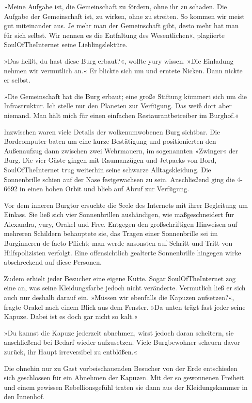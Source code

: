 »Meine Aufgabe ist, die Gemeinschaft zu fördern, ohne ihr zu schaden. Die Aufgabe der Gemeinschaft ist, zu wirken, ohne zu streiten. So kommen wir meist gut miteinander aus. Je mehr man der Gemeinschaft gibt, desto mehr hat man für sich selbst. Wir nennen es die Entfaltung des Wesentlichen«, plagiierte SoulOfTheInternet seine Lieblingslektüre.

»Das heißt, du hast diese Burg erbaut?«, wollte yury wissen. »Die Einladung nehmen wir vermutlich an.« Er blickte sich um und erntete Nicken. Dann nickte er selbst.

»Die Gemeinschaft hat die Burg erbaut; eine große Stiftung kümmert sich um die Infrastruktur. Ich stelle nur den Planeten zur Verfügung. Das weiß dort aber niemand. Man hält mich für einen einfachen Restaurantbetreiber im Burghof.«

Inzwischen waren viele Details der wolkenumwobenen Burg sichtbar. Die Bordcomputer baten um eine kurze Bestätigung und positionierten den Außenaufzug dann zwischen zwei Wehrmauern, im sogenannten »Zwinger« der Burg. Die vier Gäste gingen mit Raumanzügen und Jetpacks von Bord, SoulOfTheInternet trug weiterhin seine schwarze Alltagskleidung. Die Sonnenbrille schien auf der Nase festgewachsen zu sein. Anschließend ging die 4-6692 in einen hohen Orbit und blieb auf Abruf zur Verfügung.

Vor dem inneren Burgtor ersuchte die Seele des Internets mit ihrer Begleitung um Einlass. Sie ließ sich vier Sonnenbrillen aushändigen, wie maßgeschneidert für Alexandra, yury, Orakel und Free. Entgegen den großschriftigen Hinweisen auf mehreren Schildern behauptete sie, das Tragen einer Sonnenbrille sei im Burginneren de facto Pflicht; man werde ansonsten auf Schritt und Tritt von Hilfspolizisten verfolgt. Eine offensichtlich gealterte Sonnenbrille hingegen wirke abschreckend auf diese Personen.

Zudem erhielt jeder Besucher eine eigene Kutte. Sogar SoulOfTheInternet zog eine an, was seine Kleidungsfarbe jedoch nicht veränderte. Vermutlich ließ er sich auch nur deshalb darauf ein. »Müssen wir ebenfalls die Kapuzen aufsetzen?«, fragte Orakel nach einem Blick aus dem Fenster. »Da unten trägt fast jeder seine Kapuze. Dabei ist es doch gar nicht so kalt.«

»Du kannst die Kapuze jederzeit abnehmen, wirst jedoch daran scheitern, sie anschließend bei Bedarf wieder aufzusetzen. Viele Burgbewohner scheuen davor zurück, ihr Haupt irreversibel zu entblößen.«

Die ohnehin nur zu Gast vorbeischauenden Besucher von der Erde entschieden sich geschlossen für ein Abnehmen der Kapuzen. Mit der so gewonnenen Freiheit und einem gewissen Rebellionsgefühl traten sie dann aus der Kleidungskammer in den Innenhof.

